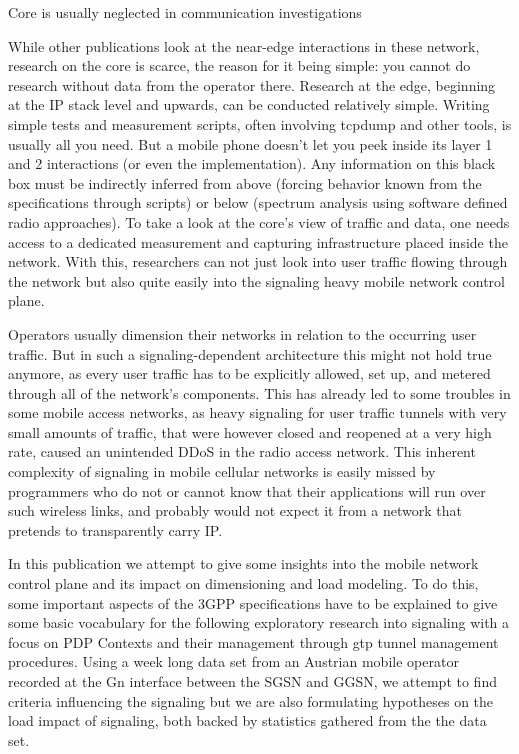 
Core is usually neglected in communication investigations


While other publications look at the near-edge interactions in these network, research on the core is scarce, the reason for it being simple: you cannot do research without data from the operator there. Research at the edge, beginning at the IP stack level and upwards, can be conducted relatively simple. Writing simple tests and measurement scripts, often involving tcpdump and other tools, is usually all you need. But a mobile phone doesn't let you peek inside its layer 1 and 2 interactions (or even the implementation). Any information on this black box must be indirectly inferred from above (forcing behavior known from the specifications through scripts) or below (spectrum analysis using software defined radio approaches). To take a look at the core's view of traffic and data, one needs access to a dedicated measurement and capturing infrastructure placed inside the network. With this, researchers can not just look into user traffic flowing through the network but also quite easily into the signaling heavy mobile network control plane. 

Operators usually dimension their networks in relation to the occurring user traffic. But in such a signaling-dependent architecture this might not hold true anymore, as every user traffic has to be explicitly allowed, set up, and metered through all of the network's components. This has already led to some troubles in some mobile access networks, as heavy signaling for user traffic tunnels with very small amounts of traffic, that were however closed and reopened at a very high rate, caused an unintended \gls{DDoS} in the radio access network\cite{lt2012docostorm, it2011birdandroid}. 
This inherent complexity of signaling in mobile cellular networks is easily missed by programmers who do not or cannot know that their applications will run over such wireless links, and probably would not expect it from a network that pretends to transparently carry IP.

In this publication we attempt to give some insights into the mobile network control plane and its impact on dimensioning and load modeling. To do this, some important aspects of the \gls{3GPP} specifications have to be explained to give some basic vocabulary for the following exploratory research into signaling with a focus on \gls{PDP} Contexts and their management through \gls{gtp} tunnel management procedures. Using a week long data set from an Austrian mobile operator recorded at the Gn interface between the \gls{SGSN} and \gls{GGSN}, we attempt to find criteria influencing the signaling but we are also formulating hypotheses on the load impact of signaling, both backed by statistics gathered from the the data set.\\



